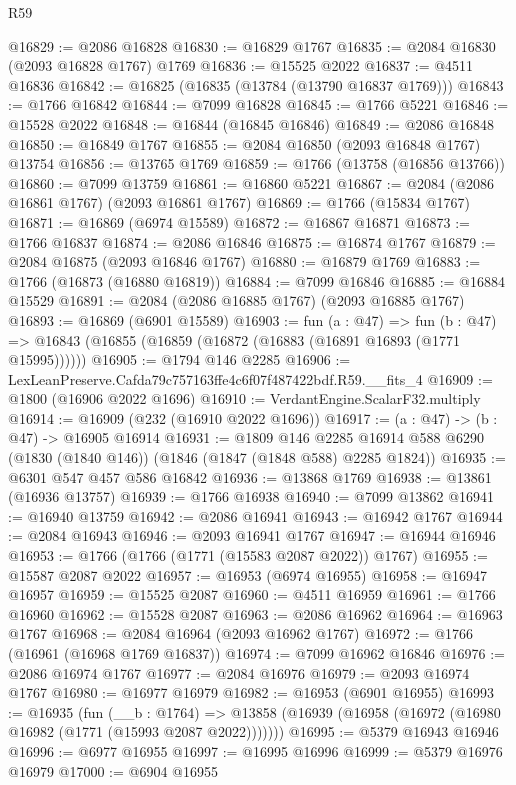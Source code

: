 \begin{lexlean}{R59}
\begin{coremodule}
@16829 := @2086 @16828
@16830 := @16829 @1767
@16835 := @2084 @16830 (@2093 @16828 @1767) @1769
@16836 := @15525 @2022
@16837 := @4511 @16836
@16842 := @16825 (@16835 (@13784 (@13790 @16837 @1769)))
@16843 := @1766 @16842
@16844 := @7099 @16828
@16845 := @1766 @5221
@16846 := @15528 @2022
@16848 := @16844 (@16845 @16846)
@16849 := @2086 @16848
@16850 := @16849 @1767
@16855 := @2084 @16850 (@2093 @16848 @1767) @13754
@16856 := @13765 @1769
@16859 := @1766 (@13758 (@16856 @13766))
@16860 := @7099 @13759
@16861 := @16860 @5221
@16867 := @2084 (@2086 @16861 @1767) (@2093 @16861 @1767)
@16869 := @1766 (@15834 @1767)
@16871 := @16869 (@6974 @15589)
@16872 := @16867 @16871
@16873 := @1766 @16837
@16874 := @2086 @16846
@16875 := @16874 @1767
@16879 := @2084 @16875 (@2093 @16846 @1767)
@16880 := @16879 @1769
@16883 := @1766 (@16873 (@16880 @16819))
@16884 := @7099 @16846
@16885 := @16884 @15529
@16891 := @2084 (@2086 @16885 @1767) (@2093 @16885 @1767)
@16893 := @16869 (@6901 @15589)
@16903 := fun (a : @47) =>
  fun (b : @47) => @16843 (@16855 (@16859 (@16872 (@16883 (@16891 @16893 (@1771 @15995))))))
@16905 := @1794 @146 @2285
@16906 := LexLeanPreserve.Cafda79c757163ffe4c6f07f487422bdf.R59.__fits_4
@16909 := @1800 (@16906 @2022 @1696)
@16910 := VerdantEngine.ScalarF32.multiply
@16914 := @16909 (@232 (@16910 @2022 @1696))
@16917 := (a : @47) -> (b : @47) -> @16905 @16914
@16931 := @1809
    @146
    @2285
    @16914
    @588
    @6290
    (@1830 (@1840 @146))
    (@1846 (@1847 (@1848 @588) @2285 @1824))
@16935 := @6301 @547 @457 @586 @16842
@16936 := @13868 @1769
@16938 := @13861 (@16936 @13757)
@16939 := @1766 @16938
@16940 := @7099 @13862
@16941 := @16940 @13759
@16942 := @2086 @16941
@16943 := @16942 @1767
@16944 := @2084 @16943
@16946 := @2093 @16941 @1767
@16947 := @16944 @16946
@16953 := @1766 (@1766 (@1771 (@15583 @2087 @2022)) @1767)
@16955 := @15587 @2087 @2022
@16957 := @16953 (@6974 @16955)
@16958 := @16947 @16957
@16959 := @15525 @2087
@16960 := @4511 @16959
@16961 := @1766 @16960
@16962 := @15528 @2087
@16963 := @2086 @16962
@16964 := @16963 @1767
@16968 := @2084 @16964 (@2093 @16962 @1767)
@16972 := @1766 (@16961 (@16968 @1769 @16837))
@16974 := @7099 @16962 @16846
@16976 := @2086 @16974 @1767
@16977 := @2084 @16976
@16979 := @2093 @16974 @1767
@16980 := @16977 @16979
@16982 := @16953 (@6901 @16955)
@16993 := @16935
    (fun (__b : @1764) =>
    @13858 (@16939 (@16958 (@16972 (@16980 @16982 (@1771 (@15993 @2087 @2022)))))))
@16995 := @5379 @16943 @16946
@16996 := @6977 @16955
@16997 := @16995 @16996
@16999 := @5379 @16976 @16979
@17000 := @6904 @16955

\end{coremodule}
\end{lexlean}
